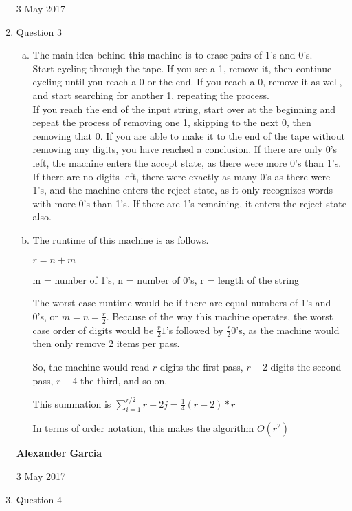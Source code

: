 \documentclass[11pt]{article}
\begin{document}
\begin{enumerate}
			3 May 2017 \\

		\item Question 3

			\begin{enumerate}[(a)]

				\item The main idea behind this machine is to erase pairs of 1's and 0's. \\

					Start cycling through the tape. If you see a 1, remove it, then continue cycling until you reach a
					0 or the end. If you reach a 0, remove it as well, and start searching for another 1, repeating the process. \\

					If you reach the end of the input string, start over at the beginning and repeat the process of removing one 1, skipping
					to the next 0, then removing that 0. If you are able to make it to the end of the tape without removing any digits, you have
					reached a conclusion. If there are only 0's left, the machine enters the accept state, as there were more 0's than 1's. If there
					are no digits left, there were exactly as many 0's as there were 1's, and the machine enters the reject state, as it only recognizes
					words with more 0's than 1's. If there are 1's remaining, it enters the reject state also. \\

				\item The runtime of this machine is as follows.

					$r = n + m$

					m = number of 1's, n = number of 0's, r = length of the string

					The worst case runtime would be if there are equal numbers of 1's and 0's, or $m=n=\frac{r}{2}$. Because of the way this machine
					operates, the worst case order of digits would be $\frac{r}{2} 1$'s followed by $\frac{r}{2} 0$'s, as the machine would then only
					remove 2 items per pass.

					So, the machine would read $r$ digits the first pass, $r-2$ digits the second pass, $r-4$ the third, and so on.

					This summation is $\sum_{i=1}^{r/2}{r-2j} = \frac{1}{4} (r-2)*r$

					In terms of order notation, this makes the algorithm $O(r^2)$ \\

			\end{enumerate}

			\newpage

			\textbf{Alexander Garcia}

			3 May 2017 \\

		\item Question 4

	\end{enumerate}
\end{document}
